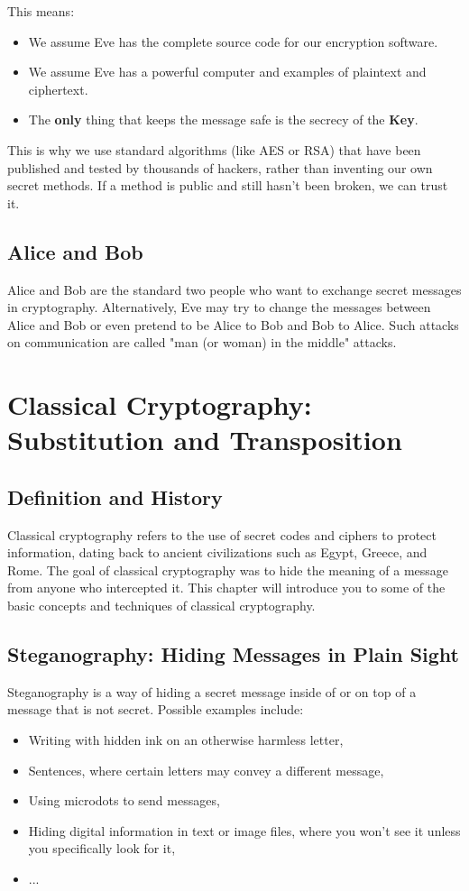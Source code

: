 \documentclass[11pt,a4paper]{report}
\begin{document}
This means:
\begin{itemize}
    \item We assume Eve has the complete source code for our encryption software.
    \item We assume Eve has a powerful computer and examples of plaintext and ciphertext.
    \item The \textbf{only} thing that keeps the message safe is the secrecy of the \textbf{Key}.
\end{itemize}

This is why we use standard algorithms (like AES or RSA) that have been published and tested by thousands of hackers, rather than inventing our own secret methods. If a method is public and still hasn't been broken, we can trust it.

\subsection{Alice and Bob}
Alice and Bob are the standard two people who want to exchange secret messages in cryptography.
Alternatively, Eve may try to change the messages between Alice and Bob or even pretend to be Alice to Bob and Bob to Alice.
Such attacks on communication are called "man (or woman) in the middle" attacks.

\section{Classical Cryptography: Substitution and Transposition}

\subsection{Definition and History}

Classical cryptography refers to the use of secret codes and ciphers to protect information, dating back to ancient civilizations such as Egypt, Greece, and Rome.
The goal of classical cryptography was to hide the meaning of a message from anyone who intercepted it.
This chapter will introduce you to some of the basic concepts and techniques of classical cryptography.
\subsection{Steganography: Hiding Messages in Plain Sight}
Steganography is a way of hiding a secret message inside of or on top of a message that is not secret.
Possible examples include:
\begin{itemize}
\item Writing with hidden ink on an otherwise harmless letter,
\item Sentences, where certain letters may convey a different message,
\item Using microdots to send messages,
\item Hiding digital information in text or image files, where you won't see it unless you specifically look for it,
\item ...
\end{itemize}
\end{document}
